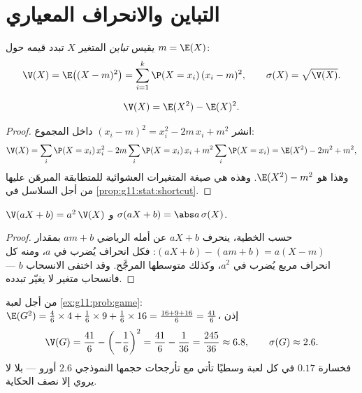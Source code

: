 \section{التباين والانحراف المعياري}

\begin{definition}[التباين]\label{def:g11:prob:variance}
يقيس \emph{تباين} المتغير $X$ تبدد قيمه
حول  $m = \E(X)$:
\[
\V(X) = \E\bigl((X - m)^2\bigr)
= \sum_{i=1}^{k} \P(X = x_i)\,(x_i - m)^2,
\qquad
\sigma(X) = \sqrt{\V(X)} .
\]
\end{definition}

\begin{proposition}\label{prop:g11:prob:konig}
\[
\V(X) = \E(X^2) - \E(X)^2 .
\]
\end{proposition}

\begin{proof}
انشر $(x_i - m)^2 = x_i^2 - 2m\,x_i + m^2$ داخل المجموع:
\[
\V(X) = \sum_i \P(X = x_i)\,x_i^2
- 2m \sum_i \P(X = x_i)\,x_i + m^2\sum_i \P(X = x_i)
= \E(X^2) - 2m^2 + m^2 ,
\]
وهذا هو $\E(X^2) - m^2$. وهذه هي صيغة المتغيرات العشوائية
للمتطابقة المبرهَن عليها من أجل السلاسل في \cref{prop:g11:stat:shortcut}.
\end{proof}

\begin{proposition}\label{prop:g11:prob:affine}
$\V(aX + b) = a^2\,\V(X)$ و $\sigma(aX + b) = \abs a\,\sigma(X)$.
\end{proposition}

\begin{proof}
حسب الخطية، ينحرف $aX + b$ عن أمله الرياضي $a m + b$ بمقدار
$(aX + b) - (am + b) = a(X - m)$: فكل انحراف يُضرب في $a$، ومنه
كل انحراف مربع يُضرب في $a^2$، وكذلك متوسطها المرجَّح. وقد
اختفى الانسحاب $b$ --- فانسحاب متغير لا يغيّر
تبدده.
\end{proof}

\begin{example}\label{ex:g11:prob:variance}
من أجل لعبة \cref{ex:g11:prob:game}:
$\E(G^2) = \frac46 \times 4 + \frac16 \times 9 + \frac16 \times 16
= \frac{16 + 9 + 16}{6} = \frac{41}{6}$، إذن
\[
\V(G) = \frac{41}{6} - \left(-\frac16\right)^2
= \frac{41}{6} - \frac{1}{36} = \frac{245}{36} \approx 6.8,
\qquad
\sigma(G) \approx 2.6 .
\]
فخسارة $0.17$ في كل لعبة وسطيًا تأتي مع تأرجحات حجمها النموذجي
$2.6$ أورو ---  بلا  لا يروي إلا نصف
الحكاية.
\end{example}

